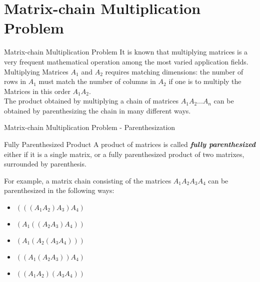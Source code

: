 \section{Matrix-chain Multiplication Problem}


\begin{frame}{Matrix-chain Multiplication Problem}
  It is known that multiplying matrices is a very frequent mathematical
  operation among the most varied application fields. Multiplying Matrices 
  $A_1$ and $A_2$ requires matching dimensions: the number of rows in $A_1$
  must match the number of columns in $A_2$ if one is to multiply the Matrices 
  in this order $A_{1}A_{2}$.
  \\
  \vspace{2em}
  The product obtained by multiplying a chain of matrices $A_{1}A_{2}...A_{n}$ 
  can be obtained by parenthesizing the chain in many different ways.
\end{frame}


\begin{frame}{Matrix-chain Multiplication Problem - Parenthesization}
  \begin{block}{Fully Parenthesized Product}
    A product of matrices is called \textbf{\emph{fully parenthesized}}
    either if it is a single matrix, or a fully parenthesized product of two matrixes, 
    surrounded by parenthesis.
  \end{block}
  \pause
  For example, a matrix chain consisting of the matrices $A_{1}A_{2}A_{3}A_{4}$ can be
  parenthesized in the following ways:
  \begin{itemize}
    \item $(((A_{1}A_{2})A_{3})A_{4})$
    \item $(A_{1}((A_{2}A_{3})A_{4}))$
    \item $(A_{1}(A_{2}(A_{3}A_{4})))$
    \item $((A_{1}(A_{2}A_{3}))A_{4})$
    \item $((A_{1}A_{2})(A_{3}A_{4}))$
  \end{itemize}
\end{frame}

